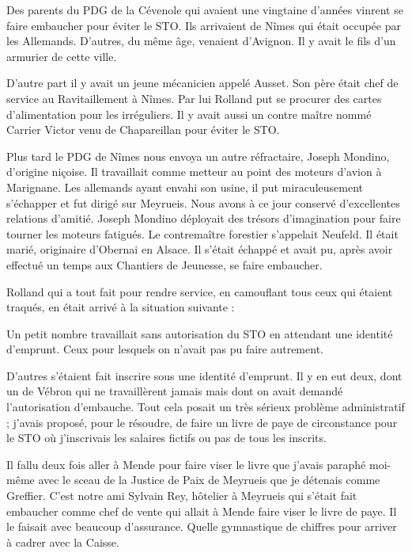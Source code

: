 Des parents du PDG de la Cévenole qui avaient une vingtaine d’années vinrent se faire
embaucher pour éviter le STO. Ils arrivaient de Nîmes qui était occupée par les Allemands.
D’autres, du même âge, venaient d’Avignon. Il y avait le fils d’un armurier de cette ville.


D’autre part il y avait un jeune mécanicien appelé Ausset. Son père était chef de service au
Ravitaillement à Nîmes. Par lui Rolland put se procurer des cartes d’alimentation pour les
irréguliers. Il y avait aussi un contre maître nommé Carrier Victor venu de Chapareillan pour
éviter le STO.

Plus tard le PDG de Nîmes nous envoya un autre réfractaire, Joseph Mondino, d’origine
niçoise. Il travaillait comme metteur au point des moteurs d’avion à Marignane. Les
allemands ayant envahi son usine, il put miraculeusement s’échapper et fut dirigé sur
Meyrueis. Nous avons à ce jour conservé d’excellentes relations d’amitié. Joseph Mondino
déployait des trésors d’imagination pour faire tourner les moteurs fatigués. Le contremaître
forestier s’appelait Neufeld. Il était marié, originaire d’Obernai en Alsace. Il s’était échappé
et avait pu, après avoir effectué un temps aux Chantiers de Jeunesse, se faire embaucher.

Rolland qui a tout fait pour rendre service, en camouflant tous ceux qui étaient traqués, en
était arrivé à la situation suivante :

Un petit nombre travaillait sans autorisation du STO en attendant une identité d’emprunt.
Ceux pour lesquels on n’avait pas pu faire autrement.

D’autres s’étaient fait inscrire sous une identité d’emprunt. Il y en eut deux, dont un de
Vébron qui ne travaillèrent jamais mais dont on avait demandé l’autorisation d’embauche.
Tout cela posait un très sérieux problème administratif ; j’avais proposé, pour le résoudre, de
faire un livre de paye de circonstance pour le STO où j’inscrivais les salaires fictifs ou pas de
tous les inscrits.

Il fallu deux fois aller à Mende pour faire viser le livre que j’avais paraphé moi-même avec le
sceau de la Justice de Paix de Meyrueis que je détenais comme Greffier. C’est notre ami
Sylvain Rey, hôtelier à Meyrueis qui s’était fait embaucher comme chef de vente qui allait à
Mende faire viser le livre de paye. Il le faisait avec beaucoup d’assurance. Quelle
gymnastique de chiffres pour arriver à cadrer avec la Caisse.

